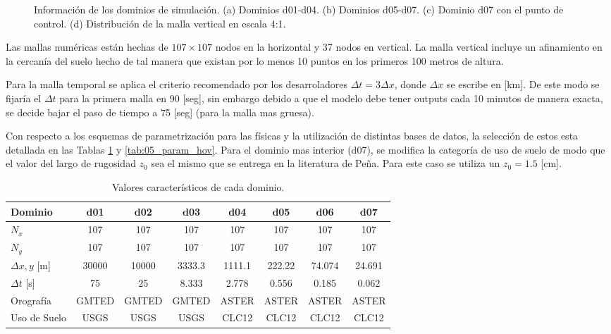\begin{figure}[H]
	\caption{Información de los dominios de simulación. (a) Dominios d01-d04. (b) Dominios d05-d07. (c) Dominio d07 con el punto de control. (d) Distribución de la malla vertical en escala 4:1.}
	\label{fig:05_dom_hov}
\end{figure}

Las mallas numéricas están hechas de $107\times107$ nodos en la horizontal y 37 nodos en vertical. La malla vertical incluye un afinamiento en la cercanía del suelo hecho de tal manera que existan por lo menos 10 puntos en los primeros 100 metros de altura. 

Para la malla temporal se aplica el criterio recomendado por los desarroladores $\Delta t = 3\Delta x$, donde $\Delta x$ se escribe en [km]. De este modo se fijaría el $\Delta t$ para la primera malla en 90 [seg], sin embargo debido a que el modelo debe tener outputs cada 10 minutos de manera exacta, se decide bajar el paso de tiempo a 75 [seg] (para la malla mas gruesa).

Con respecto a los esquemas de parametrización para las físicas y la utilización de distintas bases de datos, la selección de estos esta detallada en las Tablas \ref{tab:05_caract_hov} y \ref{tab:05_param_hov}. Para el dominio mas interior (d07), se modifica la categoría de uso de suelo de modo que el valor del largo de rugosidad $z_0$ sea el mismo que se entrega en la literatura de Peña. Para este caso se utiliza un $z_0 = 1.5$ [cm].

\begin{table}[h!]
	\caption{Valores característicos de cada dominio.}\label{tab:05_caract_hov}
	\centering\footnotesize
	\begin{tabular}{lccccccc}
		\toprule
		Dominio 				& d01	&	d02	&	d03	&	d04	&	d05	&	d06 &	d07 \\
		\midrule
		$N_x$		& 107 & 107 & 107 &107&107&107&107  \\
		$N_y$	 		& 107 & 107 & 107 &107&107&107&107  \\
		$\Delta x, y$	[m]	 		& 30000 & 10000 & 3333.3 &1111.1&222.22&74.074&24.691  \\
		$\Delta t$	[s]	 		& 75 & 25 & 8.333 &2.778&0.556&0.185&0.062  \\
		Orografía		 	& GMTED & GMTED & GMTED &ASTER&ASTER&ASTER&ASTER  \\
		Uso de Suelo					& USGS & USGS & USGS &CLC12&CLC12&CLC12&CLC12 \\
		\bottomrule
	\end{tabular}
\end{table}

